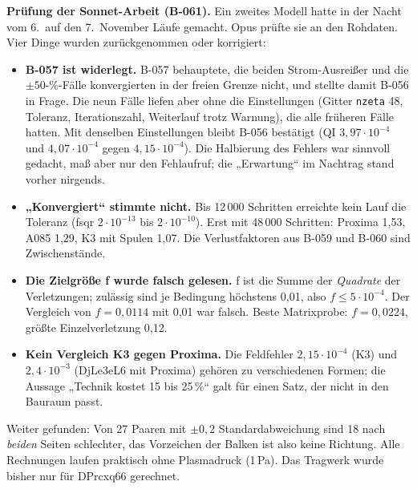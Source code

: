 \textbf{Prüfung der Sonnet-Arbeit (B-061).} Ein zweites Modell hatte in der Nacht vom 6.\ auf den 7.\ November Läufe gemacht. Opus prüfte sie an den Rohdaten. Vier Dinge wurden zurückgenommen oder korrigiert:
\begin{itemize}\itemsep1pt
\item \textbf{B-057 ist widerlegt.} B-057 behauptete, die beiden Strom-Ausreißer und die $\pm50$-\%-Fälle konvergierten in der freien Grenze nicht, und stellte damit B-056 in Frage. Die neun Fälle liefen aber ohne die Einstellungen
(Gitter \texttt{nzeta} 48, Toleranz, Iterationszahl, Weiterlauf trotz Warnung), die alle früheren Fälle hatten. Mit denselben Einstellungen bleibt B-056 bestätigt (QI $3{,}97\cdot10^{-4}$ und $4{,}07\cdot10^{-4}$ gegen $4{,}15\cdot10^{-4}$). Die
Halbierung des Fehlers war sinnvoll gedacht, maß aber nur den Fehlaufruf; die „Erwartung“ im Nachtrag stand vorher nirgends.
\item \textbf{„Konvergiert“ stimmte nicht.} Bis 12\,000 Schritten erreichte kein Lauf die Toleranz (fsqr $2\cdot10^{-13}$ bis $2\cdot10^{-10}$). Erst mit 48\,000 Schritten: Proxima 1,53, A085 1,29, K3 mit Spulen 1,07. Die Verlustfaktoren aus B-059 und B-060 sind
Zwischenstände.
\item \textbf{Die Zielgröße f wurde falsch gelesen.} f ist die Summe der \emph{Quadrate} der Verletzungen; zulässig sind je Bedingung höchstens 0,01, also $f\le5\cdot10^{-4}$. Der Vergleich von $f=0{,}0114$ mit 0,01 war falsch. Beste Matrixprobe: $f=0{,}0224$, größte Einzelverletzung 0,12.
\item \textbf{Kein Vergleich K3 gegen Proxima.} Die Feldfehler $2{,}15\cdot10^{-4}$ (K3) und $2{,}4\cdot10^{-3}$ (DjLe3eL6 mit Proxima) gehören zu verschiedenen Formen; die Aussage „Technik kostet 15 bis 25\,\%“ galt für einen Satz, der nicht in den Bauraum passt.
\end{itemize}
Weiter gefunden: Von 27 Paaren mit $\pm0{,}2$ Standardabweichung sind 18 nach \emph{beiden} Seiten schlechter, das Vorzeichen der Balken ist also keine Richtung. Alle Rechnungen laufen praktisch ohne Plasmadruck (1\,Pa). Das Tragwerk wurde bisher nur für DPrcxq66 gerechnet.

